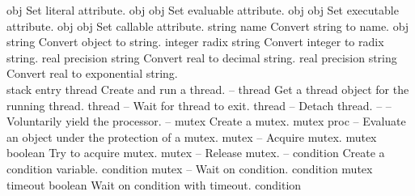 \begin{longtable}{}
	{{\bf {}}}
	{obj}
	{Set literal attribute.}
\hline
\optableent
	{obj}
	{{\bf {}}}
	{obj}
	{Set evaluable attribute.}
\hline
\optableent
	{obj}
	{{\bf {}}}
	{obj}
	{Set executable attribute.}
\hline
\optableent
	{obj}
	{{\bf {}}}
	{obj}
	{Set callable attribute.}
\hline
\optableent
	{string}
	{{\bf {}}}
	{name}
	{Convert string to name.}
\hline
\optableent
	{obj}
	{{\bf {}}}
	{string}
	{Convert object to string.}
\hline
\optableent
	{integer radix}
	{{\bf {}}}
	{string}
	{Convert integer to radix string.}
\hline
\optableent
	{real precision}
	{{\bf {}}}
	{string}
	{Convert real to decimal string.}
\hline
\optableent
	{real precision}
	{{\bf {}}}
	{string}
	{Convert real to exponential string.}
\hline \hline
{} \\
\hline \hline
\optableent
	{stack entry}
	{{\bf {}}}
	{thread}
	{Create and run a thread.}
\hline
\optableent
	{--}
	{{\bf {}}}
	{thread}
	{Get a thread object for the running thread.}
\hline
\optableent
	{thread}
	{{\bf {}}}
	{--}
	{Wait for thread to exit.}
\hline
\optableent
	{thread}
	{{\bf {}}}
	{--}
	{Detach thread.}
\hline
\optableent
	{--}
	{{\bf {}}}
	{--}
	{Voluntarily yield the processor.}
\hline
\optableent
	{--}
	{{\bf {}}}
	{mutex}
	{Create a mutex.}
\hline
\optableent
	{mutex proc}
	{{\bf {}}}
	{--}
	{Evaluate an object under the protection of a mutex.}
\hline
\optableent
	{mutex}
	{{\bf {}}}
	{--}
	{Acquire mutex.}
\hline
\optableent
	{mutex}
	{{\bf {}}}
	{boolean}
	{Try to acquire mutex.}
\hline
\optableent
	{mutex}
	{{\bf {}}}
	{--}
	{Release mutex.}
\hline
\optableent
	{--}
	{{\bf {}}}
	{condition}
	{Create a condition variable.}
\hline
\optableent
	{condition mutex}
	{{\bf {}}}
	{--}
	{Wait on condition.}
\hline
\optableent
	{condition mutex timeout}
	{{\bf {}}}
	{boolean}
	{Wait on condition with timeout.}
\hline
\optableent
	{condition}

\end{longtable}

